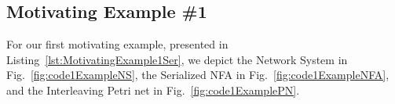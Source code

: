 \subsection{Motivating Example \#1}
\label{appendix:subsec::Ex1A:NS}


For our first motivating example, presented in Listing~\ref{lst:MotivatingExample1Ser}, we depict the Network System in Fig.~\ref{fig:code1ExampleNS}, the Serialized NFA in Fig.~\ref{fig:code1ExampleNFA}, and the Interleaving Petri net in Fig.~\ref{fig:code1ExamplePN}.



